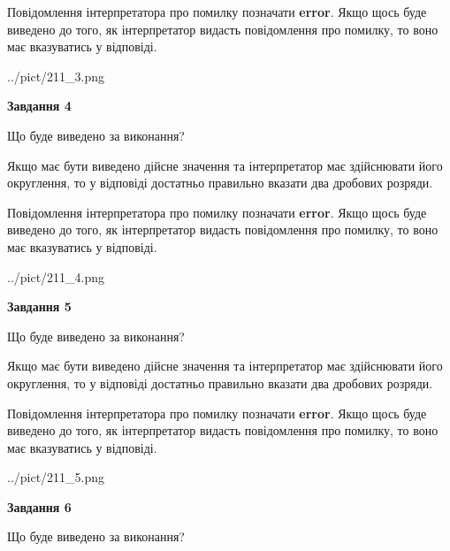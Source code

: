 \documentclass[12pt, ukrainian]{article}
\begin{document}
{\begin {Large}
Повідомлення інтерпретатора про помилку позначати \textbf{error}.
Якщо щось буде виведено до того, як інтерпретатор видасть повідомлення про помилку, 
то воно має вказуватись у відповіді. \par

\begin{center}
	{../pict/211_3.png}
\end{center}
\newpage

{\begin {center}\textbf{Завдання 4}\end {center}}\par
Що буде виведено за виконання? \par

Якщо має бути виведено дійсне значення та інтерпретатор має здійснювати його округлення, 
то у відповіді достатньо правильно вказати два дробових розряди.

Повідомлення інтерпретатора про помилку позначати \textbf{error}.
Якщо щось буде виведено до того, як інтерпретатор видасть повідомлення про помилку, 
то воно має вказуватись у відповіді. \par

\begin{center}
	{../pict/211_4.png}
\end{center}
\newpage

{\begin {center}\textbf{Завдання 5}\end {center}}\par
Що буде виведено за виконання? \par

Якщо має бути виведено дійсне значення та інтерпретатор має здійснювати його округлення, 
то у відповіді достатньо правильно вказати два дробових розряди.

Повідомлення інтерпретатора про помилку позначати \textbf{error}.
Якщо щось буде виведено до того, як інтерпретатор видасть повідомлення про помилку, 
то воно має вказуватись у відповіді. \par

\begin{center}
	{../pict/211_5.png}
\end{center}
\newpage

{\begin {center}\textbf{Завдання 6}\end {center}}\par
Що буде виведено за виконання? \par


\end{Large}}
\end{document}
